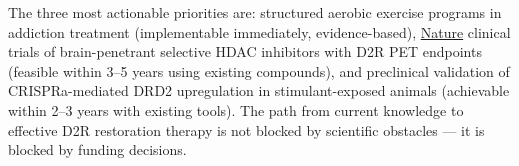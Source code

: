 The three most actionable priorities are: structured aerobic exercise programs in addiction treatment (implementable immediately, evidence-based), \href{https://www.nature.com/articles/npp2015331}{Nature} clinical trials of brain-penetrant selective HDAC inhibitors with D2R PET endpoints (feasible within 3--5 years using existing compounds), and preclinical validation of CRISPRa-mediated DRD2 upregulation in stimulant-exposed animals (achievable within 2--3 years with existing tools). The path from current knowledge to effective D2R restoration therapy is not blocked by scientific obstacles --- it is blocked by funding decisions.
